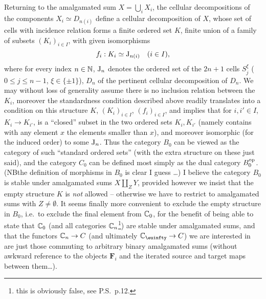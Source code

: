 \bigbreak

\presectionfill{}\par

%
\label{sec:8}%
Returning to the amalgamated sum $X = \bigcup_i X_i$, the cellular
decompositions of the components $X_i \simeq D_{n(i)}$ define a
cellular decomposition of $X$, whose set of cells with incidence
relation forms a finite ordered set $K$, finite union of a family of
subsets $(K_i)_{i\in I}$, with given isomorphisms
\[ f_i : K_i \simeq \mathrm{J}_{n(i)} \quad (i\in I),\]
where for every index $n\in{\ensuremath{\mathbb{N}}}$, $\mathrm{J}_n$ denotes the ordered set of
the $2n+1$ cells $S_j^\xi$ ($0\le j\le n-1$, $\xi\in\{\pm1\}$), $D_n$
of the pertinent cellular decomposition of $D_n$. We may without loss
of generality assume there is no inclusion relation between the $K_i$,
moreover the standardness condition described above readily translates
into a condition on this structure $K$, $(K_i)_{i\in I}$, $(f_i)_{i\in
  I}$, and implies that for $i,i'\in I$, $K_i\to K_{i'}$, is a
``closed'' subset in the two ordered sets $K_i,K_{i'}$ (namely
contains with any element $x$ the elements smaller than $x$), and
moreover isomorphic (for the induced order) to some $\mathrm{J}_n$. Thus
the category $B_0$ can be viewed as the category of such ``standard
ordered sets'' (with the extra structure on these just said), and the
category $C_0$ can be defined most simply as the dual category
$B_0^{\mathrm{op}}$. (NB\enspace the definition of morphisms in $B_0$ is clear I guess
\ldots) I believe the category $B_0$ is stable under amalgamated sums
$X \amalg_Z Y$, provided however we insist that the empty structure
$K$ is \emph{not} allowed -- otherwise we have to restrict to
amalgamated sums with $Z \ne \emptyset$. It seems finally more
convenient to exclude the empty structure in $B_0$, i.e.\ to exclude
the final element from ${\mathbb{C}}_0$, for the benefit of being able to
state that ${\mathbb{C}}_0$ (and all categories ${\mathbb{C}}_n$\footnote{this is
  obviously false, see P.S.\ p.12.}) are stable under amalgamated sums,
and that the functors ${\mathbb{C}}_n\to C$ (and ultimately $\bC_\oo\to
C$) we are interested in are just those commuting to arbitrary binary
amalgamated sums (without awkward reference to the objects $\boldsymbol F_i$
and the iterated source and target maps between them\ldots).

